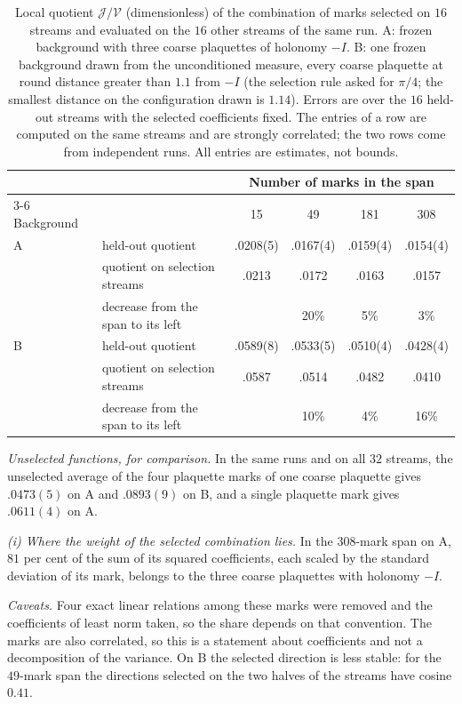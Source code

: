 \begin{table}[ht]
\centering\small
\begin{tabular}{@{}llcccc@{}}
\toprule
 & & \multicolumn{4}{c}{Number of marks in the span} \\
\cmidrule(l){3-6}
Background & & 15 & 49 & 181 & 308 \\
\midrule
\textsf{A} & held-out quotient  & .0208(5) & .0167(4) & .0159(4) & .0154(4) \\
  & quotient on selection streams & .0213 & .0172 & .0163 & .0157 \\
  & decrease from the span to its left &  & 20\% & 5\% & 3\% \\
\addlinespace
\textsf{B} & held-out quotient  & .0589(8) & .0533(5) & .0510(4) & .0428(4) \\
  & quotient on selection streams & .0587 & .0514 & .0482 & .0410 \\
  & decrease from the span to its left &  & 10\% & 4\% & 16\% \\
\bottomrule
\end{tabular}
\caption{Local quotient $\mathcal J/\mathcal V$ (dimensionless) of the combination of marks selected on $16$
streams and evaluated on the $16$ other streams of the same run. \textsf{A}: frozen background with three coarse
plaquettes of holonomy $-I$. \textsf{B}: one frozen background drawn from the unconditioned measure, every coarse
plaquette at round distance greater than $1.1$ from $-I$ (the selection rule asked for $\pi/4$; the smallest
distance on the configuration drawn is $1.14$). Errors are over the $16$ held-out streams with the
selected coefficients fixed. The entries of a row are computed on the same streams and are strongly
correlated; the two rows come from independent runs. All entries are estimates, not bounds.}
\label{tab:local}
\end{table}

\emph{Unselected functions, for comparison.} In the same runs and on all $32$ streams, the unselected average
of the four plaquette marks of one coarse plaquette gives $.0473(5)$ on \textsf{A} and $.0893(9)$ on \textsf{B}, and a single
plaquette mark gives $.0611(4)$ on \textsf{A}.

\emph{{\upshape(i)} Where the weight of the selected combination lies.} In the $308$-mark span on \textsf{A}, $81$ per cent of
the sum of its squared coefficients, each scaled by the standard deviation of its mark, belongs to the three
coarse plaquettes with holonomy $-I$.

\emph{Caveats.} Four exact linear relations among these marks were removed and the coefficients of least norm
taken, so the share depends on that convention. The marks are also correlated, so this is a statement about
coefficients and not a decomposition of the variance. On \textsf{B} the selected direction is less stable: for the
$49$-mark span the directions selected on the two halves of the streams have cosine $0.41$.

